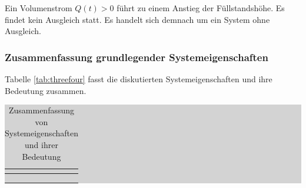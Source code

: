 \noindent Ein Volumenstrom $Q(t) > 0$ führt zu einem Anstieg der Füllstandshöhe. Es findet kein Ausgleich statt. Es handelt sich demnach um ein System ohne Ausgleich.

\clearpage

\subsubsection{Zusammenfassung grundlegender Systemeigenschaften}

Tabelle \ref{tab:threefour} fasst die diskutierten Systemeigenschaften und ihre Bedeutung zusammen.

\begin{table}[H]
\caption{Zusammenfassung von Systemeigenschaften und ihrer Bedeutung}
\setlength{\fboxsep}{0pt}%
\colorbox{lightgray}{%
%
\begin{tabular}{| c | c |}
\hline
\parbox[c][0.28in][c]{3.3in}{\smallskip\centering\textbf{\selectfont{Eigenschaft}}} & \parbox[c][0.28in][c]{3.3in}{\smallskip\centering\textbf{\selectfont{Bedeutung}}}\\ \hline

\parbox[c][1.2in][c]{3.3in}{} &
\parbox[c][1.2in][c]{3.3in}{}\\ \hline

\parbox[c][0.64in][c]{3.3in}{} & \parbox[c][0.64in][c]{3.3in}{}\\ \hline

\parbox[c][0.64in][c]{3.3in}{} &
\parbox[c][0.64in][c]{3.3in}{}\\ \hline


\end{tabular}}
\end{table}
